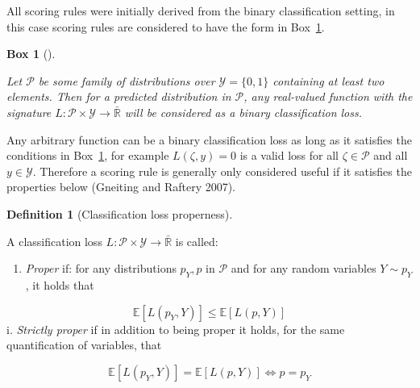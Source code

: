 \documentclass[
  letterpaper,
]{scrbook}
\providecommand{\tightlist}{%
  \setlength{\itemsep}{0pt}\setlength{\parskip}{0pt}}\usepackage{longtable,booktabs,array}
\theoremstyle{plain}
\newtheorem{conjecture}{Box}[chapter]
\theoremstyle{definition}
\newtheorem{definition}{Definition}[chapter]
\theoremstyle{remark}
\begin{document}
All scoring rules were initially derived from the binary classification
setting, in this case scoring rules are considered to have the form in
Box~\ref{cnj-loss-classif}.

\begin{tcolorbox}[enhanced jigsaw, title={Binary classification loss}, breakable, leftrule=.75mm, rightrule=.15mm, opacityback=0, coltitle=black, colback=white, toptitle=1mm, toprule=.15mm, bottomtitle=1mm, titlerule=0mm, arc=.35mm, bottomrule=.15mm, colbacktitle=quarto-callout-note-color!10!white, left=2mm, opacitybacktitle=0.6, colframe=quarto-callout-note-color-frame]

\leavevmode{}%
\begin{conjecture}[]\label{cnj-loss-classif}

Let \(\mathcal{P}\) be some family of distributions over
\(\mathcal{Y}= \{0,1\}\) containing at least two elements. Then for a
predicted distribution in \(\mathcal{P}\), any real-valued function with
the signature
\(L: \mathcal{P}\times \mathcal{Y}\rightarrow \bar{\mathbb{R}}\) will be
considered as a \emph{binary classification loss}.

\end{conjecture}

\end{tcolorbox}

Any arbitrary function can be a binary classification loss as long as it
satisfies the conditions in Box~\ref{cnj-loss-classif}, for example
\(L(\zeta, y) = 0\) is a valid loss for all \(\zeta \in \mathcal{P}\)
and all \(y \in \mathcal{Y}\). Therefore a scoring rule is generally
only considered useful if it satisfies the properties below (Gneiting
and Raftery 2007).

\leavevmode{}%
\begin{definition}[Classification loss
properness]\label{def-classif-proper}

A classification loss
\(L: \mathcal{P}\times \mathcal{Y}\rightarrow \bar{\mathbb{R}}\) is
called:

\begin{enumerate}
\def\labelenumi{\roman{enumi}.}
\tightlist
\item
  \emph{Proper} if: for any distributions \(p_Y,p\) in \(\mathcal{P}\)
  and for any random variables \(Y \sim p_Y\), it holds that
\end{enumerate}

\[
\mathbb{E}[L(p_Y, Y)] \leq \mathbb{E}[L(p, Y)]
\] i. \emph{Strictly proper} if in addition to being proper it holds,
for the same quantification of variables, that

\[
\mathbb{E}[L(p_Y, Y)] = \mathbb{E}[L(p, Y)] \Leftrightarrow p = p_Y
\]

\end{definition}
\end{document}
